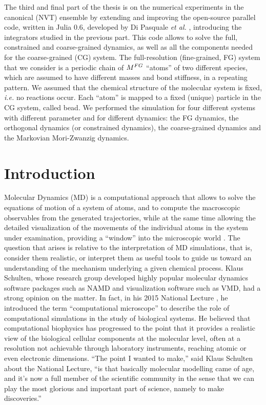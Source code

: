 \documentclass[10pt,a4paper]{book}
\theoremstyle{definition}
\begin{document}
The third and final part of the thesis is on the numerical experiments in the canonical (NVT) ensemble by extending and improving the open-source parallel code, written in Julia 0.6, developed by Di Pasquale \emph{et al.} \cite{DiPasquale2019}, introducing the integrators studied in the previous part. This code allows to solve the full, constrained and coarse-grained dynamics, as well as all the components needed for the coarse-grained (CG) system.
%
The full-resolution (fine-grained, FG) system that we consider is a periodic chain of $M^{FG}$ ``atoms'' of two different species, which are assumed to have different masses and bond stiffness, in a repeating pattern. We assumed that the chemical structure of the molecular system is fixed, \textit{i.e.} no reactions occur. Each ``atom'' is mapped to a fixed (unique) particle in the CG system, called bead. 
We performed the simulation for four different systems with different parameter and for different dynamics: the FG dynamics, the orthogonal dynamics (or constrained dynamics), the coarse-grained dynamics and the Markovian Mori-Zwanzig dynamics.


\tableofcontents

\mainmatter

\chapter*{Introduction}
{}

Molecular Dynamics (MD) is a computational approach that allows to solve the equations of motion of a system of atoms, and to compute the macroscopic observables from the generated trajectories, while at the same time allowing the detailed visualization of the movements of the individual atoms in the system under examination, providing a ``window'' into the microscopic world \cite{tuckerman2010}. The question that arises is relative to the interpretation of MD simulations, that is, consider them realistic, or interpret them as useful tools to guide us toward an understanding of the mechanism underlying a given chemical process.
%
Klaus Schulten, whose research group developed highly popular molecular dynamics software packages such as NAMD and visualization software such as VMD, had a strong opinion on the matter. In fact, in his 2015 National Lecture \cite{Pollack}, he introduced the term ``computational microscope'' to describe the role of computational simulations in the study of biological systems. He believed that computational biophysics has progressed to the point that it provides a realistic view of the biological cellular components at the molecular level, often at a resolution not achievable through laboratory instruments, reaching atomic or even electronic dimensions.  
``The point I wanted to make,'' said Klaus Schulten about the National Lecture, ``is that basically molecular modelling came of age, and it's now a full member of the scientific community in the sense that we can play the most glorious and important part of science, namely to make discoveries.'' 
\end{document}
